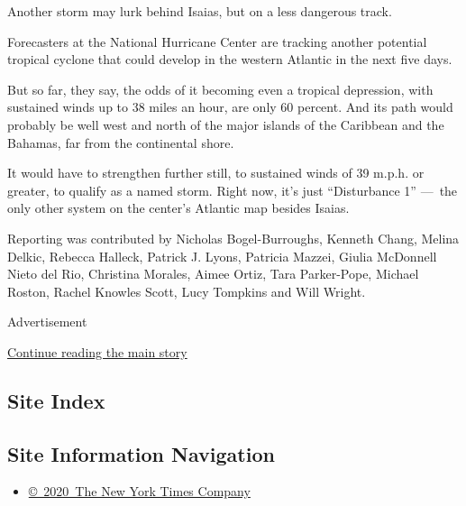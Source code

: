 Another storm may lurk behind Isaias, but on a less dangerous track.

Forecasters at the National Hurricane Center are tracking another
potential tropical cyclone that could develop in the western Atlantic in
the next five days.

But so far, they say, the odds of it becoming even a tropical
depression, with sustained winds up to 38 miles an hour, are only 60
percent. And its path would probably be well west and north of the major
islands of the Caribbean and the Bahamas, far from the continental
shore.

It would have to strengthen further still, to sustained winds of 39
m.p.h. or greater, to qualify as a named storm. Right now, it's just
``Disturbance 1'' ---~the only other system on the center's Atlantic map
besides Isaias.

Reporting was contributed by Nicholas Bogel-Burroughs, Kenneth Chang,
Melina Delkic, Rebecca Halleck, Patrick J. Lyons, Patricia Mazzei,
Giulia McDonnell Nieto del Rio, Christina Morales, Aimee Ortiz, Tara
Parker-Pope, Michael Roston, Rachel Knowles Scott, Lucy Tompkins and
Will Wright.

Advertisement

\protect\hyperlink{after-bottom}{Continue reading the main story}

\hypertarget{site-index}{%
\subsection{Site Index}\label{site-index}}

\hypertarget{site-information-navigation}{%
\subsection{Site Information
Navigation}\label{site-information-navigation}}

\begin{itemize}
\tightlist
\item
  \href{https://help.nytimes.com/hc/en-us/articles/115014792127-Copyright-notice}{©~2020~The
  New York Times Company}
\end{itemize}

